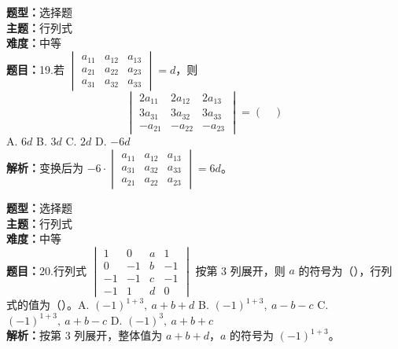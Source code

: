 \documentclass{ctexart}
\newenvironment{question}[5]{%
	\noindent\textbf{题型：}#1\\
	\textbf{主题：}#2\\
	\textbf{难度：}#3\\
	\textbf{题目：}#4\\
	\textbf{解析：}#5\\
	\vspace{1em}
}{}
\begin{document}
	\begin{question}
		{选择题}
		{行列式}
		{中等}
		{19.若 $\begin{vmatrix}a_{11} & a_{12} & a_{13} \\ a_{21} & a_{22} & a_{23} \\ a_{31} & a_{32} & a_{33}\end{vmatrix} = d$，则
			$$
			\begin{vmatrix}
				2 a_{11} & 2 a_{12} & 2 a_{13} \\
				3 a_{31} & 3 a_{32} & 3 a_{33} \\
				-a_{21} & -a_{22} & -a_{23}
			\end{vmatrix} = (\quad)
			$$
			A. $6d$ \quad B. $3d$ \quad C. $2d$ \quad D. $-6d$}
		{变换后为 $-6 \cdot \begin{vmatrix}a_{11} & a_{12} & a_{13} \\ a_{31} & a_{32} & a_{33} \\ a_{21} & a_{22} & a_{23}\end{vmatrix} = 6d$。}
	\end{question}
	
	\begin{question}
		{选择题}
		{行列式}
		{中等}
		{20.行列式 $\begin{vmatrix}1 & 0 & a & 1 \\ 0 & -1 & b & -1 \\ -1 & -1 & c & -1 \\ -1 & 1 & d & 0\end{vmatrix}$ 按第 3 列展开，则 $a$ 的符号为（\quad），行列式的值为（\quad）。A. $(-1)^{1+3},\ a + b + d$ \quad B. $(-1)^{1+3},\ a - b - c$ \quad C. $(-1)^{1+3},\ a + b - c$ \quad D. $(-1)^3,\ a + b + c$}
		{按第 3 列展开，整体值为 $a + b + d$，$a$ 的符号为 $(-1)^{1+3}$。}
	\end{question}
	
\end{document}
